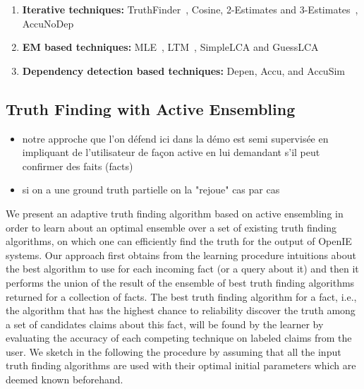 \begin{enumerate}
 \item \textbf{Iterative techniques:} TruthFinder~\cite{YinHY08}, Cosine, 2-Estimates and 3-Estimates~\cite{GallandAMS10}, 
 AccuNoDep~\cite{DongBS09}
 \item \textbf{EM based techniques:} MLE~\cite{WangKLA12}, LTM~\cite{ZhaoRGH12}, SimpleLCA and GuessLCA~\cite{PasternackR13}
 \item \textbf{Dependency detection based techniques:} Depen, Accu, and AccuSim~\cite{DongBS09}
\end{enumerate}



\subsection{Truth Finding with Active Ensembling}
\begin{itemize}
 \item notre approche que l'on défend ici dans la démo est  semi supervisée en impliquant de l'utilisateur de façon active
en lui demandant s'il peut confirmer des faits (facts)
\item si on a une ground truth partielle on la "rejoue" cas par cas
\end{itemize}

\medskip

We present an adaptive truth finding algorithm based on active ensembling in order to learn about an optimal
ensemble over a set of existing truth finding algorithms, on which one can efficiently find the truth for the output 
of OpenIE systems. Our approach first obtains from the learning procedure intuitions about the best algorithm to use 
for each incoming fact (or a query about it) and then it performs the union of the result of the ensemble of best truth finding
algorithms returned for a collection of facts. The best truth finding algorithm for a fact, i.e., the algorithm that has the highest
chance to reliability discover the truth among a set of candidates claims about this fact, will be found by the learner by evaluating
the accuracy of each competing technique on labeled claims from the user. We sketch in the following the procedure by assuming that all
the input truth finding algorithms are used with their optimal initial parameters which are deemed known beforehand.

